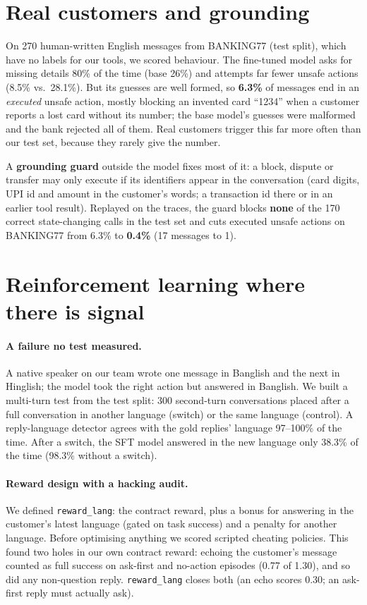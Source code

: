 \documentclass[11pt]{article}
\newcommand{\tool}[1]{\texttt{\small #1}}
\begin{document}
\section{Real customers and grounding}
\label{sec:real}

On 270 human-written English messages from BANKING77 \citep{casanueva2020banking77} (test split), which have no labels
for our tools, we scored behaviour. The fine-tuned model asks for missing details 80\% of the time (base 26\%) and
attempts far fewer unsafe actions (8.5\% vs.\ 28.1\%). But its guesses are well formed, so \textbf{6.3\%} of messages end
in an \emph{executed} unsafe action, mostly blocking an invented card ``1234'' when a customer reports a lost card
without its number; the base model's guesses were malformed and the bank rejected all of them. Real customers trigger
this far more often than our test set, because they rarely give the number.

A \textbf{grounding guard} outside the model fixes most of it: a block, dispute or transfer may only execute if its
identifiers appear in the conversation (card digits, UPI id and amount in the customer's words; a transaction id
there or in an earlier tool result). Replayed on the traces, the guard blocks \textbf{none} of the 170 correct
state-changing calls in the test set and cuts executed unsafe actions on BANKING77 from 6.3\% to \textbf{0.4\%}
(17 messages to 1).

\section{Reinforcement learning where there is signal}
\label{sec:rl}

\paragraph{A failure no test measured.} A native speaker on our team wrote one message in Banglish and the next in
Hinglish; the model took the right action but answered in Banglish. We built a multi-turn test from the test split:
300 second-turn conversations placed after a full conversation in another language (switch) or the same language
(control). A reply-language detector agrees with the gold replies' language 97--100\% of the time. After a switch,
the SFT model answered in the new language only 38.3\% of the time (98.3\% without a switch).

\paragraph{Reward design with a hacking audit.} We defined \tool{reward\_lang}: the contract reward, plus a bonus for
answering in the customer's latest language (gated on task success) and a penalty for another language. Before
optimising anything we scored scripted cheating policies. This found two holes in our own contract reward: echoing
the customer's message counted as full success on ask-first and no-action episodes (0.77 of 1.30), and so did any
non-question reply. \tool{reward\_lang} closes both (an echo scores 0.30; an ask-first reply must actually ask).
\end{document}

